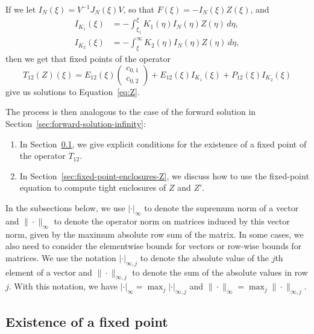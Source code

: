 \documentclass[11pt]{article}
\begin{document}
If we let \(I_{N}(\xi) = V^{-1}J_{N}(\xi)V\), so that
\(F(\xi) = -I_{N}(\xi)Z(\xi)\), and
\begin{align*}
  I_{K_{1}}(\xi)
  &= -\int_{\xi_{1}}^{\xi} K_{1}(\eta)I_{N}(\eta)Z(\eta)\,d\eta,\\
  I_{K_{2}}(\xi)
  &= -\int_{\xi}^{\infty} K_{2}(\eta)I_{N}(\eta)Z(\eta)\,d\eta,
\end{align*}
then we get that fixed points of the operator
\begin{equation}\label{eq:T_12}
  T_{12}(Z)(\xi) = E_{12}(\xi)\begin{pmatrix} c_{0,1} \\ c_{0,2} \end{pmatrix}
  + E_{12}(\xi)I_{K_{1}}(\xi) + P_{12}(\xi)I_{K_{2}}(\xi)
\end{equation}
give us solutions to Equation~\eqref{eq:Z}.

The process is then analogous to the case of the forward solution in
Section~\ref{sec:forward-solution-infinity}:
\begin{enumerate}
\item In Section~\ref{sec:fixed-point-Z}, we give explicit conditions
  for the existence of a fixed point of the operator \(T_{12}\).
\item In Section~\ref{sec:fixed-point-enclosures-Z}, we discuss how to
  use the fixed-point equation to compute tight enclosures of \(Z\)
  and \(Z'\).
\end{enumerate}

In the subsections below, we use \(|\cdot|_{\infty}\) to denote the
supremum norm of a vector and \(\|\cdot\|_{\infty}\) to denote the
operator norm on matrices induced by this vector norm, given by the
maximum absolute row sum of the matrix. In some cases, we also need to
consider the elementwise bounds for vectors or row-wise bounds for
matrices. We use the notation \(|\cdot|_{\infty,j}\) to denote the
absolute value of the \(j\)th element of a vector and
\(\|\cdot\|_{\infty,j}\) to denote the sum of the absolute values in
row \(j\). With this notation, we have
\(|\cdot|_{\infty} = \max_{j} |\cdot|_{\infty,j}\) and
\(\|\cdot\|_{\infty} = \max_{j} \|\cdot\|_{\infty,j}\).

\subsection{Existence of a fixed point}
\label{sec:fixed-point-Z}
\end{document}
